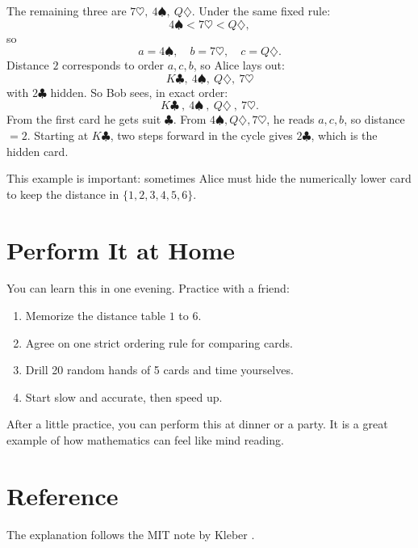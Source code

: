The remaining three are \(7\heartsuit,\ 4\spadesuit,\ Q\diamondsuit\). Under
the same fixed rule:
\[
4\spadesuit < 7\heartsuit < Q\diamondsuit,
\]
so
\[
a=4\spadesuit,\quad b=7\heartsuit,\quad c=Q\diamondsuit.
\]
Distance \(2\) corresponds to order \(a,c,b\), so Alice lays out:
\[
K\clubsuit,\ 4\spadesuit,\ Q\diamondsuit,\ 7\heartsuit
\]
with \(2\clubsuit\) hidden.
So Bob sees, in exact order:
\[
\boxed{K\clubsuit}\ ,\ \boxed{4\spadesuit}\ ,\ \boxed{Q\diamondsuit}\ ,\ \boxed{7\heartsuit}.
\]
From the first card he gets suit \(\clubsuit\). From
\(4\spadesuit,Q\diamondsuit,7\heartsuit\), he reads \(a,c,b\), so distance
\(=2\). Starting at \(K\clubsuit\), two steps forward in the cycle gives
\(2\clubsuit\), which is the hidden card.

This example is important: sometimes Alice must hide the numerically lower card
to keep the distance in \(\{1,2,3,4,5,6\}\).

\section{Perform It at Home}
You can learn this in one evening. Practice with a friend:
\begin{enumerate}
  \item Memorize the distance table \(1\) to \(6\).
  \item Agree on one strict ordering rule for comparing cards.
  \item Drill 20 random hands of 5 cards and time yourselves.
  \item Start slow and accurate, then speed up.
\end{enumerate}

After a little practice, you can perform this at dinner or a party. It is a
great example of how mathematics can feel like mind reading.

\section*{Reference}
The explanation follows the MIT note by Kleber \cite{kleber:fitch-cheney}.
